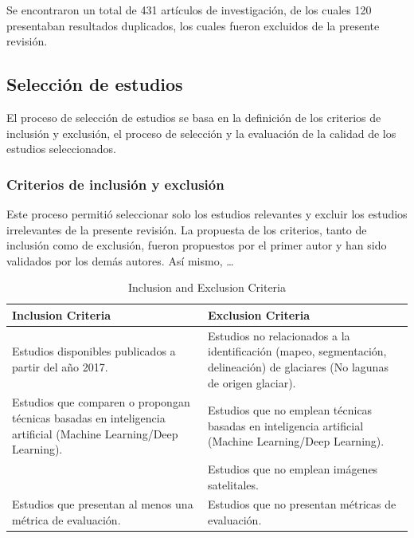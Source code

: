 \documentclass{article}
\begin{document}
Se encontraron un total de 431 artículos de investigación, de los cuales 120 presentaban resultados duplicados, los cuales fueron excluidos de la presente revisión.

\subsection{Selección de estudios}

El proceso de selección de estudios se basa en la definición de los criterios de inclusión y exclusión, el proceso de selección y la evaluación de la calidad de los estudios seleccionados.

\subsubsection{Criterios de inclusión y exclusión}

Este proceso permitió seleccionar solo los estudios relevantes y excluir los estudios irrelevantes de la presente revisión. La propuesta de los criterios, tanto de inclusión como de exclusión, fueron propuestos por el primer autor y han sido validados por los demás autores. Así mismo, …

\begin{table}[H]
    \centering
    \caption{Inclusion and Exclusion Criteria}
    \hspace{1cm}
    \label{tab:inclusion_exclusion_criteria}
    \begin{tabularx}{\textwidth}{XX}
        \hline
        \textbf{Inclusion Criteria}                                                                                     & \textbf{Exclusion Criteria}                                                                                                  \\ \hline
        Estudios disponibles publicados a partir del año 2017.                                                          & Estudios no relacionados a la identificación (mapeo, segmentación, delineación) de glaciares (No lagunas de origen glaciar). \\
        Estudios que comparen o propongan técnicas basadas en inteligencia artificial (Machine Learning/Deep Learning). & Estudios que no emplean técnicas basadas en inteligencia artificial (Machine Learning/Deep Learning).                        \\
                                                                                                                        & Estudios que no emplean imágenes satelitales.                                                                                \\
        Estudios que presentan al menos una métrica de evaluación.                                                      & Estudios que no presentan métricas de evaluación.                                                                            \\ \hline
    \end{tabularx}
\end{table}
\end{document}

